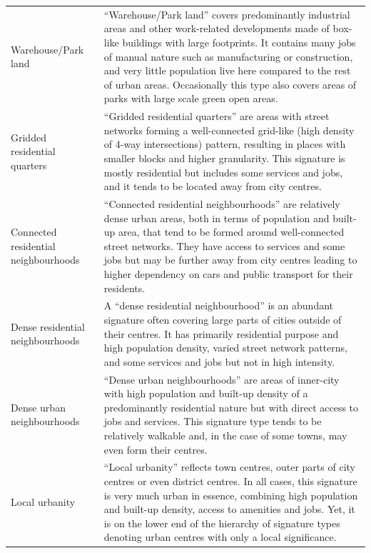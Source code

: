 \begin{longtable}{p{}p{}}
    Warehouse/Park land                  &                                “Warehouse/Park land” covers predominantly industrial areas and other work-related developments made of box-like buildings with large footprints. It contains many jobs of manual nature such as manufacturing or construction, and very little population live here compared to the rest of urban areas. Occasionally this type also covers areas of parks with large scale green open areas. \\
    Gridded residential quarters         &                                                                                  “Gridded residential quarters” are areas with street networks forming a well-connected grid-like (high density of 4-way intersections) pattern, resulting in places with smaller blocks and higher granularity. This signature is mostly residential but includes some services and jobs, and it tends to be located away from city centres. \\
    Connected residential neighbourhoods &                                                                     “Connected residential neighbourhoods” are relatively dense urban areas, both in terms of population and built-up area, that tend to be formed around well-connected street networks. They have access to services and some jobs but may be further away from city centres leading to higher dependency on cars and public transport for their residents. \\
    Dense residential neighbourhoods     &                                                                                                                                           A “dense residential neighbourhood” is an abundant signature often covering large parts of cities outside of their centres. It has primarily residential purpose and high population density, varied street network patterns, and some services and jobs but not in high intensity. \\
    Dense urban neighbourhoods           &                                                                                                                            “Dense urban neighbourhoods” are areas of inner-city with high population and built-up density of a predominantly residential nature but with direct access to jobs and services. This signature type tends to be relatively walkable and, in the case of some towns, may even form their centres. \\
    Local urbanity                       &                                                                “Local urbanity” reflects town centres, outer parts of city centres or even district centres. In all cases, this signature is very much urban in essence, combining high population and built-up density, access to amenities and jobs. Yet, it is on the lower end of the hierarchy of signature types denoting urban centres with only a local significance. \\

\end{longtable}
